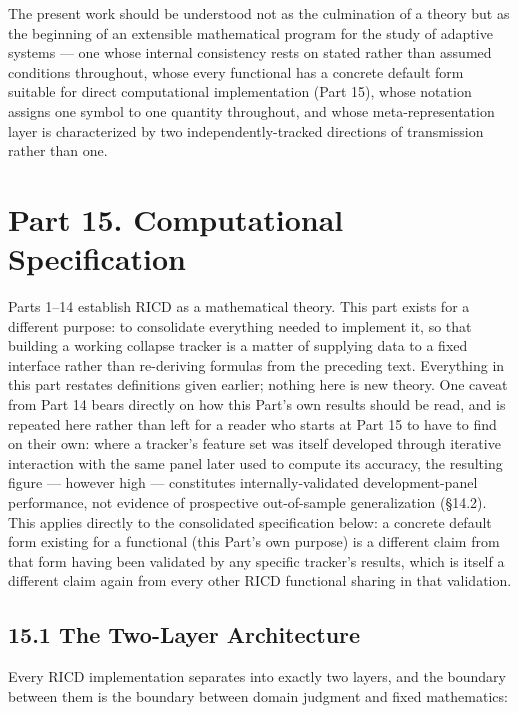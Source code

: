 \documentclass[
]{article}
\begin{document}
The present work should be understood not as the culmination of a theory
but as the beginning of an extensible mathematical program for the study
of adaptive systems --- one whose internal consistency rests on stated
rather than assumed conditions throughout, whose every functional has a
concrete default form suitable for direct computational implementation
(Part 15), whose notation assigns one symbol to one quantity throughout,
and whose meta-representation layer is characterized by two
independently-tracked directions of transmission rather than one.

\hypertarget{part-15.-computational-specification}{%
\section{Part 15. Computational
Specification}\label{part-15.-computational-specification}}

Parts 1--14 establish RICD as a mathematical theory. This part exists
for a different purpose: to consolidate everything needed to implement
it, so that building a working collapse tracker is a matter of supplying
data to a fixed interface rather than re-deriving formulas from the
preceding text. Everything in this part restates definitions given
earlier; nothing here is new theory. One caveat from Part 14 bears
directly on how this Part's own results should be read, and is repeated
here rather than left for a reader who starts at Part 15 to have to find
on their own: where a tracker's feature set was itself developed through
iterative interaction with the same panel later used to compute its
accuracy, the resulting figure --- however high --- constitutes
internally-validated development-panel performance, not evidence of
prospective out-of-sample generalization (§14.2). This applies directly
to the consolidated specification below: a concrete default form
existing for a functional (this Part's own purpose) is a different claim
from that form having been validated by any specific tracker's results,
which is itself a different claim again from every other RICD functional
sharing in that validation.

\hypertarget{the-two-layer-architecture}{%
\subsection{15.1 The Two-Layer
Architecture}\label{the-two-layer-architecture}}

Every RICD implementation separates into exactly two layers, and the
boundary between them is the boundary between domain judgment and fixed
mathematics:
\end{document}
